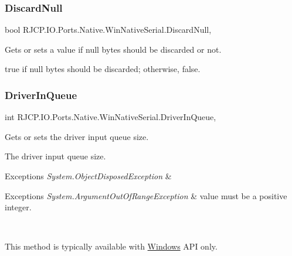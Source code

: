 \subsubsection{\texorpdfstring{DiscardNull}{DiscardNull}}
{\footnotesize\ttfamily bool R\+J\+C\+P.\+I\+O.\+Ports.\+Native.\+Win\+Native\+Serial.\+Discard\+Null\hspace{0.3cm}{\ttfamily [get]}, {\ttfamily [set]}}



Gets or sets a value if null bytes should be discarded or not. 

{\ttfamily true} if null bytes should be discarded; otherwise, {\ttfamily false}. \mbox{\label{class_r_j_c_p_1_1_i_o_1_1_ports_1_1_native_1_1_win_native_serial_a896990d639f535f06bfe41e8343f8494}} 
\subsubsection{\texorpdfstring{DriverInQueue}{DriverInQueue}}
{\footnotesize\ttfamily int R\+J\+C\+P.\+I\+O.\+Ports.\+Native.\+Win\+Native\+Serial.\+Driver\+In\+Queue\hspace{0.3cm}{\ttfamily [get]}, {\ttfamily [set]}}



Gets or sets the driver input queue size. 

The driver input queue size. 


\begin{DoxyExceptions}{Exceptions}
{\em System.\+Object\+Disposed\+Exception} & 
\begin{DoxyExceptions}{Exceptions}
{\em System.\+Argument\+Out\+Of\+Range\+Exception} & value must be a positive integer.\\
\hline
\end{DoxyExceptions}
\\
\hline
\end{DoxyExceptions}
This method is typically available with \mbox{\hyperlink{namespace_r_j_c_p_1_1_i_o_1_1_ports_1_1_native_1_1_windows}{Windows}} A\+PI only. \mbox{\label{class_r_j_c_p_1_1_i_o_1_1_ports_1_1_native_1_1_win_native_serial_a5bcff144464e9623c2f705e9aa12c3f8}} 
